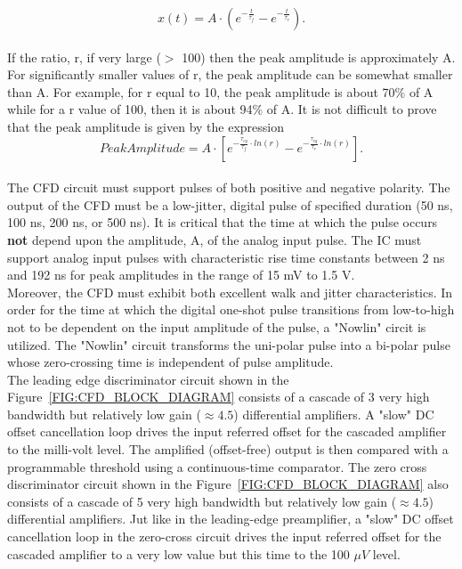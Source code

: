 \documentclass[12pt, onecolumn]{IEEEtran}
\begin{document}
\begin{equation}
x(t) = A \cdot (e^{-\frac{t}{\tau_f}} - e^{-\frac{t}{\tau_r}}).
\end{equation}\\


If the ratio, r, if very large ($>$ 100) then the peak amplitude is approximately A.  For significantly smaller values of r, the peak amplitude can be somewhat smaller than A. For example, for r equal to 10, the peak amplitude is about 70\% of A while for a r value of 100, then it is about 94\% of A.  It is not difficult to prove that the peak amplitude is given by the expression\\

\begin{equation}
Peak Amplitude = A \cdot \left[ e^{-\frac{\tau_{eq}}{\tau_f} \cdot ln(r)} - e^{-\frac{\tau_{eq}}{\tau_r} \cdot ln(r)} \right].
\end{equation}\\


The CFD circuit must support pulses of both positive and negative polarity. The output of the CFD must be a low-jitter, digital pulse of specified duration (50 ns, 100 ns, 200 ns, or 500 ns).  It is critical that the time at which the pulse occurs \textbf{not} depend upon the amplitude, A, of the analog input pulse.  The IC must support analog input pulses with characteristic rise time constants between 2 ns and 192 ns for peak amplitudes in the range of 15 mV to 1.5 V. \\

Moreover, the CFD must exhibit both excellent walk and jitter characteristics.  In order for the time at which the digital one-shot pulse transitions from low-to-high not to be dependent on the input amplitude of the pulse, a "Nowlin" circit is utilized. The "Nowlin" circuit transforms the uni-polar pulse into a bi-polar pulse whose zero-crossing time is independent of pulse amplitude.\\

The leading edge discriminator circuit shown in the Figure~\ref{FIG:CFD_BLOCK_DIAGRAM} consists of a cascade of 3 very high bandwidth but relatively low gain ($\approx 4.5$) differential amplifiers. A "slow" DC offset cancellation loop drives the input referred offset for the cascaded amplifier to the milli-volt level. The amplified (offset-free) output is then compared with a programmable threshold using a continuous-time comparator. The zero cross discriminator circuit shown in the Figure~\ref{FIG:CFD_BLOCK_DIAGRAM} also consists of a cascade of 5 very high bandwidth but relatively low gain ($\approx 4.5$) differential amplifiers. Jut like in the leading-edge preamplifier, a "slow" DC offset cancellation loop in the zero-cross circuit drives the input referred offset for the cascaded amplifier to a very low value but this time to the 100 $\mu V$ level. \\
\end{document}
